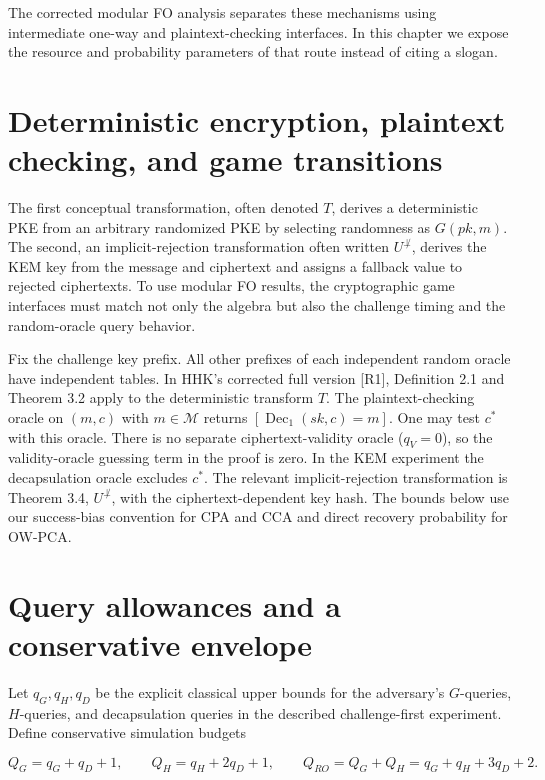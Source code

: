 \documentclass[
  11pt,
  a4paper,
  oneside]{report}
\begin{document}
The corrected modular FO analysis separates these mechanisms using
intermediate one-way and plaintext-checking interfaces. In this chapter
we expose the resource and probability parameters of that route instead
of citing a slogan.

\section{Deterministic encryption, plaintext checking, and game
transitions}\label{deterministic-encryption-plaintext-checking-and-game-transitions}

The first conceptual transformation, often denoted \(T\), derives a
deterministic PKE from an arbitrary randomized PKE by selecting
randomness as \(G(pk,m)\). The second, an implicit-rejection
transformation often written \(U^{\not\perp}\), derives the KEM key from
the message and ciphertext and assigns a fallback value to rejected
ciphertexts. To use modular FO results, the cryptographic game
interfaces must match not only the algebra but also the challenge timing
and the random-oracle query behavior.

Fix the challenge key prefix. All other prefixes of each independent
random oracle have independent tables. In HHK's corrected full version
{[}R1{]}, Definition 2.1 and Theorem 3.2 apply to the deterministic
transform \(T\). The plaintext-checking oracle on \((m,c)\) with
\(m\in\mathcal M\) returns \([\operatorname{Dec}_1(sk,c)=m]\). One may
test \(c^*\) with this oracle. There is no separate ciphertext-validity
oracle (\(q_V=0\)), so the validity-oracle guessing term in the proof is
zero. In the KEM experiment the decapsulation oracle excludes \(c^*\).
The relevant implicit-rejection transformation is Theorem 3.4,
\(U^{\not\perp}\), with the ciphertext-dependent key hash. The bounds
below use our success-bias convention for CPA and CCA and direct
recovery probability for OW-PCA.

\section{Query allowances and a conservative
envelope}\label{query-allowances-and-a-conservative-envelope}

Let \(q_G,q_H,q_D\) be the explicit classical upper bounds for the
adversary's \(G\)-queries, \(H\)-queries, and decapsulation queries in
the described challenge-first experiment. Define conservative simulation
budgets

\[
Q_G=q_G+q_D+1,
\qquad
Q_H=q_H+2q_D+1,
\qquad
Q_{RO}=Q_G+Q_H=q_G+q_H+3q_D+2.
\]
\end{document}
